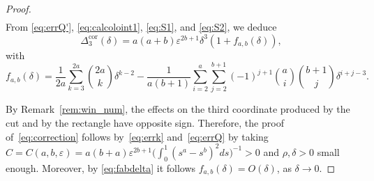 \documentclass[10pt,a4paper]{amsart}
\newcommand{\De}{\Delta}
\newcommand{\cor}{\mathrm{cor}}
\newcommand{\de}{\delta}
\newcommand{\e}{\varepsilon}
\begin{document}
\begin{proof}
\begin{align}
    \end{align}
    From \eqref{eq:errQ'}, \eqref{eq:calcoloint1}, \eqref{eq:S1}, and \eqref{eq:S2}, we deduce
    \begin{equation}
        \label{eq:errQ}
        \De_3^{\cor}(\de)=a(a+b)\e^{2b+1}\de^3(1+f_{a,b}(\de)),
    \end{equation}
    with
    \begin{equation}
        \label{eq:fabdelta}
        f_{a,b}(\de)= \frac{1}{2a} \sum_{k=3}^{2a}\binom{2a}{k}\de^{k-2} - \frac{1}{a(b+1)} \sum_{i=2}^{a}\sum_{j=2}^{b+1}(-1)^{j+1}\binom{a}{i}\binom{b+1}{j}\de^{i+j-3}.
    \end{equation}
    
    
	
	By Remark~\ref{rem:win_num}, the effects on the third coordinate produced by the cut and by the rectangle have opposite sign. Therefore, the proof of~\eqref{eq:correction} follows by~\eqref{eq:errk} and~\eqref{eq:errQ} by taking $C=C(a,b,\e)=a(b+a)\e^{2b+1}\big(\int_{0}^{1} (s^a-s^b)^2ds\big)^{-1}>0$ and $\rho,\de>0$ small enough. Moreover, by \eqref{eq:fabdelta} it follows $f_{a,b}(\de)=O(\de)$, as $\de\to0$.
\end{proof}
\end{document}
